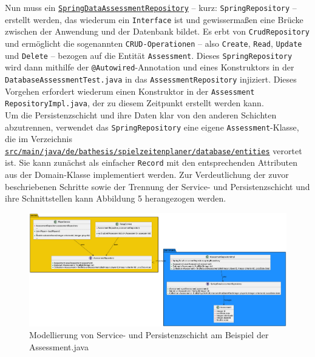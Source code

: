 \pagebreak

Nun muss ein 
\href{https://github.com/FlorianOhmes/bat_spielzeitenplaner/blob/0a423a3298919d7206b87d381ecbbd66c6c54869/spielzeitenplaner/src/main/java/de/bathesis/spielzeitenplaner/database/springrepos/SpringDataAssessmentRepository.java}{\texttt{SpringDataAssessmentRepository}} 
-- kurz: \texttt{SpringRepository} -- erstellt werden, das wiederum ein 
\texttt{Interface} ist und gewissermaßen eine Brücke zwischen der Anwendung und 
der Datenbank bildet. Es erbt von \texttt{CrudRepository} und ermöglicht die 
sogenannten \texttt{CRUD-Operationen} -- also \texttt{Create}, \texttt{Read}, 
\texttt{Update} und \texttt{Delete} -- bezogen auf die Entität \texttt{Assessment}. 
Dieses \texttt{SpringRepository} wird dann mithilfe der 
\texttt{@Autowired}-Annotation und eines Konstruktors in der 
\texttt{DatabaseAssessmentTest.java} in das \texttt{AssessmentRepository} injiziert. 
Dieses Vorgehen erfordert wiederum einen Konstruktor in der 
\texttt{Assessment \linebreak RepositoryImpl.java}, der zu diesem Zeitpunkt erstellt 
werden kann. \\ 
Um die Persistenzschicht und ihre Daten klar von den anderen Schichten abzutrennen, 
verwendet das \texttt{SpringRepository} eine eigene \texttt{Assessment}-Klasse, die 
im Verzeichnis
\href{https://github.com/FlorianOhmes/bat_spielzeitenplaner/tree/main/spielzeitenplaner/src/main/java/de/bathesis/spielzeitenplaner/database/entities}{\texttt{src/main/java/de/bathesis/spielzeitenplaner/database/entities}}
verortet ist. Sie kann zunächst als einfacher \texttt{Record} mit den entsprechenden 
Attributen aus der Domain-Klasse implementiert werden. Zur Verdeutlichung der zuvor 
beschriebenen Schritte sowie der Trennung der Service- und Persistenzschicht und ihre 
Schnittstellen kann Abbildung 5 herangezogen werden. \\ 

\begin{figure}[h]
  \centering
  \includegraphics[width=\textwidth]{screenshots/persistence.png}
  \caption{Modellierung von Service- und Persistenzschicht am Beispiel der Assessment.java}
  \label{fig:persistence}
\end{figure}

